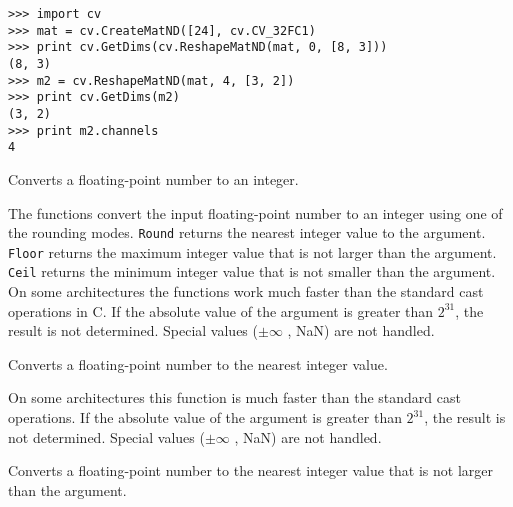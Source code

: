 \begin{lstlisting}
>>> import cv
>>> mat = cv.CreateMatND([24], cv.CV_32FC1)
>>> print cv.GetDims(cv.ReshapeMatND(mat, 0, [8, 3]))
(8, 3)
>>> m2 = cv.ReshapeMatND(mat, 4, [3, 2])
>>> print cv.GetDims(m2)
(3, 2)
>>> print m2.channels
4
\end{lstlisting}
\fi

\ifC
{}\label{cvRound}

Converts a floating-point number to an integer.


\begin{description}
\end{description}


The functions convert the input floating-point number to an integer using one of the rounding
modes. \texttt{Round} returns the nearest integer value to the
argument. \texttt{Floor} returns the maximum integer value that is not
larger than the argument. \texttt{Ceil} returns the minimum integer
value that is not smaller than the argument. On some architectures the
functions work much faster than the standard cast
operations in C. If the absolute value of the argument is greater than
$2^{31}$, the result is not determined. Special values ($\pm \infty$ , NaN)
are not handled.

\else


Converts a floating-point number to the nearest integer value.


\begin{description}
\end{description}

On some architectures this function is much faster than the standard cast
operations. If the absolute value of the argument is greater than
$2^{31}$, the result is not determined. Special values ($\pm \infty$ , NaN)
are not handled.


Converts a floating-point number to the nearest integer value that is not larger than the argument.


